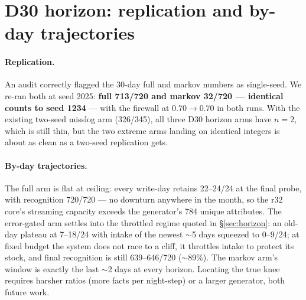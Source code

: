 \documentclass[11pt]{article}
\begin{document}
\section{D30 horizon: replication and by-day trajectories}\label{app:d30}

\paragraph{Replication.} An audit correctly flagged the 30-day full and markov numbers as
single-seed. We re-ran both at seed 2025: \textbf{full 713/720 and markov 32/720 --- identical
counts to seed 1234} --- with the firewall at $0.70\to0.70$ in both runs. With the existing
two-seed misslog arm (326/345), all three D30 horizon arms have $n{=}2$, which is still thin,
but the two extreme arms landing on identical integers is about as clean as a two-seed
replication gets.

\paragraph{By-day trajectories.} The full arm is flat at ceiling: every write-day retains
22--24/24 at the final probe, with recognition 720/720 --- no downturn anywhere in the month, so
the r32 core's streaming capacity exceeds the generator's 784 unique attributes. The error-gated
arm settles into the throttled regime quoted in \S\ref{sec:horizon}: an old-day plateau at
7--18/24 with intake of the newest $\sim$5 days squeezed to 0--9/24; at fixed budget the system
does not race to a cliff, it throttles intake to protect its stock, and final recognition is
still 639--646/720 ($\sim$89\%). The markov arm's window is exactly the last $\sim$2 days at
every horizon. Locating the true knee requires harsher ratios (more facts per night-step) or a
larger generator, both future work.
\end{document}
